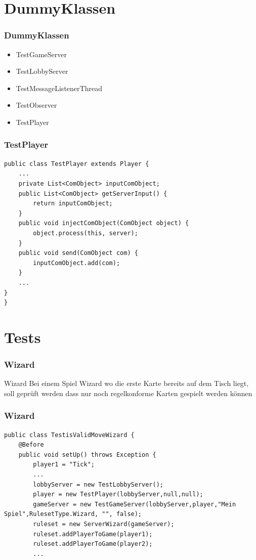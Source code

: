 \documentclass{beamer}
\begin{document}
\section{DummyKlassen}
	
	\begin{frame}[fragile]
		\frametitle{DummyKlassen}
		\begin{itemize}
			\item TestGameServer
			\item TestLobbyServer
			\item TestMessageListenerThread
			\item TestObserver
			\item TestPlayer
		\end{itemize}

	\end{frame}
	\begin{frame}[fragile]
		\frametitle{TestPlayer}
\begin{lstlisting}
public class TestPlayer extends Player {
	...
	private List<ComObject> inputComObject;	
	public List<ComObject> getServerInput() {
		return inputComObject;
	}	
	public void injectComObject(ComObject object) {
		object.process(this, server);
	}
	public void send(ComObject com) {
		inputComObject.add(com);
	}
	...
}
}

\end{lstlisting}
	\end{frame}
\section{Tests}

\begin{frame}
\frametitle{Wizard}
	\begin{block}
		{Wizard} Bei einem Spiel Wizard wo die erste Karte bereits auf dem Tisch liegt, soll geprüft werden dass nur noch regelkonforme Karten gespielt werden können
	\end{block}
\end{frame}

	\begin{frame}[fragile]
	\frametitle{Wizard}
	\begin{lstlisting}
public class TestisValidMoveWizard {
	@Before
	public void setUp() throws Exception {
		player1 = "Tick";
		...
		lobbyServer = new TestLobbyServer();
		player = new TestPlayer(lobbyServer,null,null);
		gameServer = new TestGameServer(lobbyServer,player,"Mein Spiel",RulesetType.Wizard, "", false);
		ruleset = new ServerWizard(gameServer);				
		ruleset.addPlayerToGame(player1);
		ruleset.addPlayerToGame(player2);
        ...		
	\end{lstlisting}	
	
	\end{frame}
	
\end{document}
